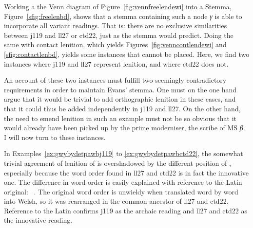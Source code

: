Working a the Venn diagram of Figure~\ref{fig:vennfreelendewi} into a Stemma, \ie Figure~\ref{sfig:freelenbd}, shows that a stemma containing such a node \textit{γ} is able to incorporate all variant readings. That is: there are no exclusive similarities between \gls{j119} and \gls{ll27} or \gls{ctd22}, just as the stemma would predict. Doing the same with contact lenition, which yields Figures~\ref{fig:venncontlendewi} and \ref{sfig:contactlenbd}, yields some instances that cannot be placed. Here, we find two instances where \gls{j119} and \gls{ll27} represent lenition, and where \gls{ctd22} does not.

An account of these two instances must fulfill two seemingly contradictory requirements in order to maintain Evans' stemma. One must on the one hand argue that it would be trivial to add orthographic lenition in these cases, and that it could thus be added independently in \gls{j119} and \gls{ll27}. On the other hand, the need to emend lenition in such an example must not be so obvious that it would already have been picked up by the prime moderniser, the scribe of MS \textit{β}. I will now turn to these instances. 

In Examples~\ref{ex:gwybydetpawbj119} to \ref{ex:gwybydetpawbctd22}, the somewhat trivial agreement of lenition of  is overshadowed by the different position of , especially because the word order found in \gls{ll27} and \gls{ctd22} is in fact the innovative one. The difference in word order is easily explained with reference to the Latin original: ~\autocite[157]{Wad_Vitae13}.  The original word order is unwieldy when translated word by word into Welsh, so it was rearranged in the common ancestor of \gls{ll27} and \gls{ctd22}. Reference to the Latin confirms \gls{j119} as the archaic reading and \gls{ll27} and \gls{ctd22} as the innovative reading.

